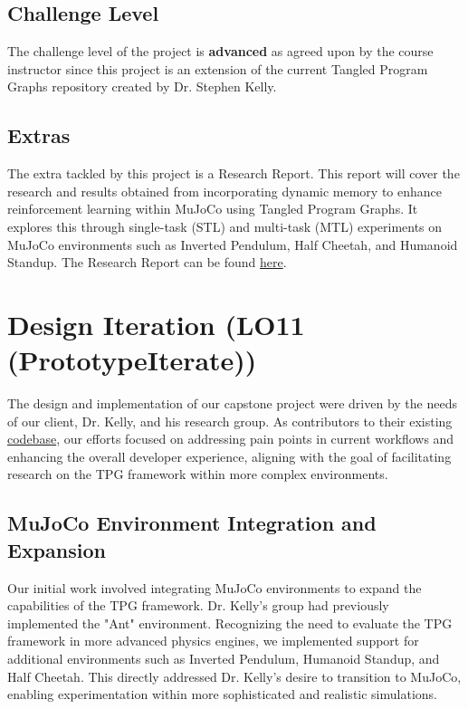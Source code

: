 \documentclass{article}
\begin{document}
\subsection{Challenge Level}
The challenge level of the project is \textbf{advanced} as agreed upon by the course instructor since this project is an extension of the current Tangled Program Graphs repository created by Dr. Stephen Kelly.

\subsection{Extras}
The extra tackled by this project is a Research Report. This report will cover the research and results obtained from incorporating dynamic memory to enhance reinforcement learning within MuJoCo using Tangled Program Graphs.
It explores this through single-task (STL) and multi-task (MTL) experiments on MuJoCo environments such as Inverted Pendulum, Half Cheetah, and Humanoid Standup.
The Research Report can be found \href{https://github.com/TPGEngine/tpg/blob/main/docs/Extras/ResearchReport(Advanced)/ResearchReport.pdf}{here}.

\section{Design Iteration (LO11 (PrototypeIterate))}

The design and implementation of our capstone project were driven by the needs of our client, Dr. Kelly, and his research group. As contributors to their existing \href{https://gitlab.cas.mcmaster.ca/kellys32/tpg}{codebase}, our efforts focused on addressing pain points in current workflows and enhancing the overall developer experience, aligning with the goal of facilitating research on the TPG framework within more complex environments.

\subsection{MuJoCo Environment Integration and Expansion}

Our initial work involved integrating MuJoCo environments to expand the capabilities of the TPG framework. Dr. Kelly's group had previously implemented the "Ant" environment. Recognizing the need to evaluate the TPG framework in more advanced physics engines, we implemented support for additional environments such as Inverted Pendulum, Humanoid Standup, and Half Cheetah. This directly addressed Dr. Kelly's desire to transition to MuJoCo, enabling experimentation within more sophisticated and realistic simulations.
\end{document}
